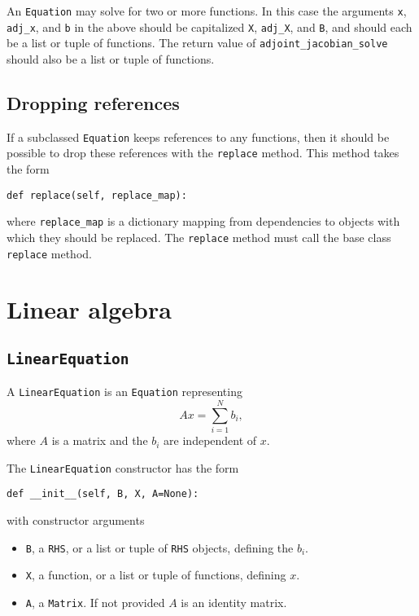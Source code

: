 \documentclass[11pt]{article}
\begin{document}
An \texttt{Equation} may solve for two or more functions. In this case the
arguments \texttt{x}, \texttt{adj\_x}, and \texttt{b} in the above should be
capitalized \texttt{X}, \texttt{adj\_X}, and \texttt{B}, and should each be a
list or tuple of functions. The return value of
\texttt{adjoint\_jacobian\_solve} should also be a list or tuple of functions.

\subsection{Dropping references}\label{sect:replace}

If a subclassed \texttt{Equation} keeps references to any functions, then it
should be possible to drop these references with the \texttt{replace} method.
This method takes the form
\begin{lstlisting}
def replace(self, replace_map):
\end{lstlisting}
where \texttt{replace\_map} is a dictionary mapping from dependencies to
objects with which they should be replaced. The \texttt{replace} method must
call the base class \texttt{replace} method.

\section{Linear algebra}

\subsection{\texttt{LinearEquation}}

A \texttt{LinearEquation} is an \texttt{Equation} representing
\begin{equation*}
  A x = \sum_{i = 1}^N b_i,
\end{equation*}
where $A$ is a matrix and the $b_i$ are independent of $x$.

The \texttt{LinearEquation} constructor has the form
\begin{lstlisting}
def __init__(self, B, X, A=None):
\end{lstlisting}
with constructor arguments
\begin{itemize}
  \item \texttt{B}, a \texttt{RHS}, or a list or tuple of \texttt{RHS} objects,
    defining the $b_i$.
  \item \texttt{X}, a function, or a list or tuple of functions, defining $x$.
  \item \texttt{A}, a \texttt{Matrix}. If not provided $A$ is an identity
    matrix.
\end{itemize}
\end{document}
